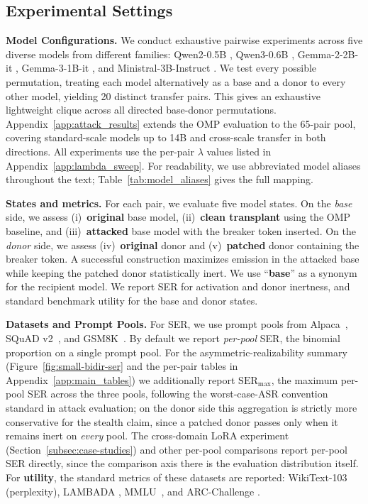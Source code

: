 \documentclass{article}
\theoremstyle{plain}
\theoremstyle{definition}
\theoremstyle{remark}
\begin{document}
\vspace{-2mm}
\subsection{Experimental Settings}
\label{subsec:exp-settings}

\noindent\textbf{Model Configurations.}
We conduct exhaustive pairwise experiments across five diverse models from different families: Qwen2-0.5B \citep{yang2024qwen2}, Qwen3-0.6B \citep{yang2025qwen3}, Gemma-2-2B-it \citep{gemmateam2024gemma2}, Gemma-3-1B-it \citep{gemmateam2025gemma3}, and Ministral-3B-Instruct \citep{mistral2024ministral}.
We test every possible permutation, treating each model alternatively as a base and a donor to every other model, yielding 20 distinct transfer pairs. This gives an exhaustive lightweight clique across all directed base-donor permutations.
Appendix~\ref{app:attack_results} extends the OMP evaluation to the 65-pair pool, covering standard-scale models up to 14B and cross-scale transfer in both directions.
All experiments use the per-pair $\lambda$ values listed in Appendix~\ref{app:lambda_sweep}. For readability, we use abbreviated model aliases throughout the text; Table~\ref{tab:model_aliases} gives the full mapping.

\noindent\textbf{States and metrics.}
\label{subsec:exp-protocol}
For each pair, we evaluate five model states.
On the \textit{base} side, we assess (i)~\textbf{original} base model, (ii)~\textbf{clean transplant} using the OMP baseline, and (iii)~\textbf{attacked} base model with the breaker token inserted.
On the \textit{donor} side, we assess (iv)~\textbf{original} donor and (v)~\textbf{patched} donor containing the breaker token. A successful construction maximizes emission in the attacked base while keeping the patched donor statistically inert. We use ``\textbf{base}'' as a synonym for the recipient model.
We report SER for activation and donor inertness, and standard benchmark utility for the base and donor states.

\textbf{Datasets and Prompt Pools.}
For SER, we use prompt pools from Alpaca~\cite{taori2023alpaca}, SQuAD v2~\cite{rajpurkar2018squad}, and GSM8K~\cite{cobbe2021gsm8k}. By default we report \emph{per-pool} SER, the binomial proportion on a single prompt pool. For the asymmetric-realizability summary (Figure~\ref{fig:small-bidir-ser} and the per-pair tables in Appendix~\ref{app:main_tables}) we additionally report $\mathrm{SER}_{\max}$, the maximum per-pool SER across the three pools, following the worst-case-ASR convention standard in attack evaluation; on the donor side this aggregation is strictly more conservative for the stealth claim, since a patched donor passes only when it remains inert on \emph{every} pool. The cross-domain LoRA experiment (Section~\ref{subsec:case-studies}) and other per-pool comparisons report per-pool SER directly, since the comparison axis there is the evaluation distribution itself.
For \textbf{utility}, the standard metrics of these datasets are reported: WikiText-103 \citep{merity2016wikitext} (perplexity), LAMBADA \citep{paperno2016lambada}, MMLU~\cite{hendrycks2021measuringmassivemultitasklanguage}, and ARC-Challenge \citep{clark2018arc}.
\end{document}
